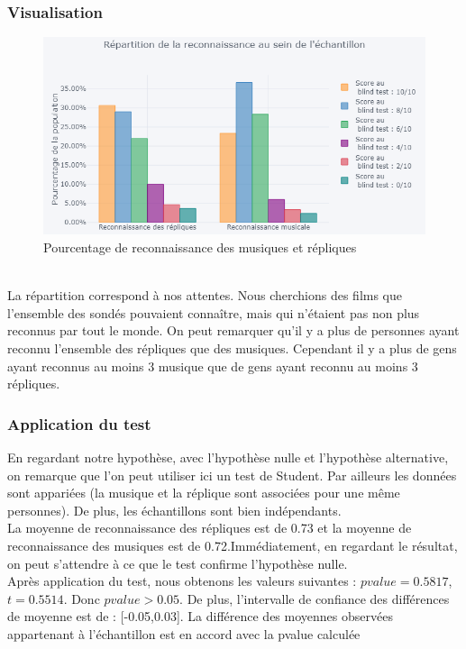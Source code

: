 \documentclass{article} %
\begin{document}
\subsubsection{Visualisation}
\begin{figure}[!h]
	\centering
	\includegraphics[keepaspectratio,scale=0.9]{h1.png}
	\caption{ Pourcentage de reconnaissance des musiques et répliques}
\end{figure}~\\
La répartition correspond à nos attentes. Nous cherchions des films que l'ensemble des sondés pouvaient connaître, mais qui n'étaient pas non plus reconnus par tout le monde. On peut remarquer qu'il y a plus de personnes ayant reconnu l'ensemble des répliques que des musiques. Cependant il y a plus de gens ayant reconnus au moins 3 musique que de gens ayant reconnu au moins 3 répliques.
\subsubsection{Application du test}
En regardant notre hypothèse, avec l’hypothèse nulle et l’hypothèse alternative, on remarque que l’on peut utiliser ici un test de Student. Par ailleurs les données sont appariées (la musique et la réplique sont associées pour une même personnes). 
De plus, les échantillons sont bien indépendants.\\

La moyenne de reconnaissance des répliques est de 0.73 et la moyenne de reconnaissance des musiques est de 0.72.Immédiatement, en regardant le résultat, on peut s’attendre à ce que le test confirme l’hypothèse nulle.\\
Après application du test, nous obtenons les valeurs suivantes : $pvalue = 0.5817$, $t = 0.5514$. Donc ${pvalue>0.05}$. De plus, l'intervalle de confiance des différences de moyenne est de : [-0.05,0.03]. La différence des moyennes observées appartenant à l'échantillon est en accord avec la pvalue calculée
\end{document}
